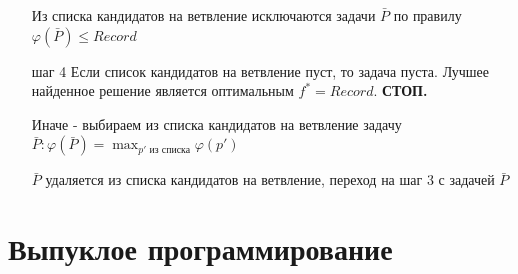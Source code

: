 \documentclass[a4paper]{article}
\theoremstyle{definition}
\theoremstyle{remark}
\begin{document}
\begin{enumerate}
    Из списка кандидатов на ветвление исключаются задачи $\bar{P}$ по правилу $\varphi(\bar{P})\le Record$
    \item [шаг 4]
    Если список кандидатов на ветвление пуст, то задача пуста. Лучшее найденное решение является оптимальным $f^* = Record$. \textbf{СТОП.}

    Иначе - выбираем из списка кандидатов на ветвление задачу $\bar {P}: \varphi(\bar{P}) = \max_{p' \text{ из списка}}\varphi(p')$

    $\bar{P}$ удаляется из списка кандидатов на ветвление, переход на шаг 3 с задачей $\bar{P}$
\end{enumerate}
\section{Выпуклое программирование}
\end{document}

